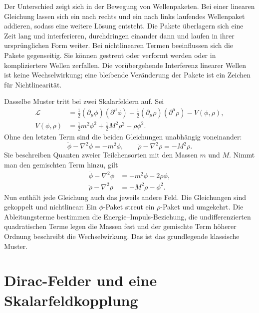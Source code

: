 Der Unterschied zeigt sich in der Bewegung von Wellenpaketen. Bei einer linearen Gleichung lassen sich ein nach rechts und ein nach links laufendes Wellenpaket addieren, sodass eine weitere Lösung entsteht. Die Pakete überlagern sich eine Zeit lang und interferieren, durchdringen einander dann und laufen in ihrer ursprünglichen Form weiter. Bei nichtlinearen Termen beeinflussen sich die Pakete gegenseitig. Sie können gestreut oder verformt werden oder in kompliziertere Wellen zerfallen. Die vorübergehende Interferenz linearer Wellen ist keine Wechselwirkung; eine bleibende Veränderung der Pakete ist ein Zeichen für Nichtlinearität.

Dasselbe Muster tritt bei zwei Skalarfeldern auf. Sei
\begin{align}
\mathcal L
&=
\frac12(\partial_\mu\phi)(\partial^\mu\phi)
+\frac12(\partial_\mu\rho)(\partial^\mu\rho)
-V(\phi,\rho),
\\
V(\phi,\rho)
&=
\frac12m^2\phi^2+\frac12M^2\rho^2+\rho\phi^2.
\end{align}
Ohne den letzten Term sind die beiden Gleichungen unabhängig voneinander:
\begin{equation}
\ddot\phi-\nabla^2\phi=-m^2\phi,
\qquad
\ddot\rho-\nabla^2\rho=-M^2\rho.
\end{equation}
Sie beschreiben Quanten zweier Teilchensorten mit den Massen \(m\) und \(M\). Nimmt man den gemischten Term hinzu, gilt
\begin{align}
\ddot\phi-\nabla^2\phi&=-m^2\phi-2\rho\phi,
\\
\ddot\rho-\nabla^2\rho&=-M^2\rho-\phi^2.
\end{align}
Nun enthält jede Gleichung auch das jeweils andere Feld. Die Gleichungen sind gekoppelt und nichtlinear: Ein \(\phi\)-Paket streut ein \(\rho\)-Paket und umgekehrt. Die Ableitungsterme bestimmen die Energie--Impuls-Beziehung, die undifferenzierten quadratischen Terme legen die Massen fest und der gemischte Term höherer Ordnung beschreibt die Wechselwirkung. Das ist das grundlegende klassische Muster.

\section{Dirac-Felder und eine Skalarfeldkopplung}

